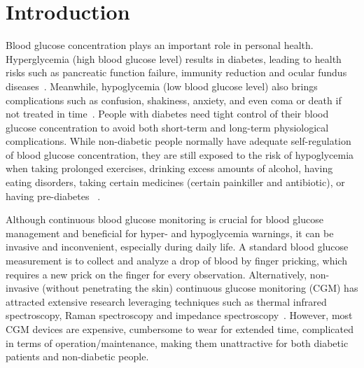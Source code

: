 
\section{Introduction}
\label{sec:intro}
Blood glucose concentration plays an important role in personal health.
Hyperglycemia (high blood glucose level) results in diabetes, leading to health risks such as pancreatic function failure, immunity reduction and ocular fundus diseases~\cite{bib:DC95:Klein}.
Meanwhile, hypoglycemia (low blood glucose level) also brings complications such as confusion, shakiness, anxiety, and even coma or death if not treated in time~\cite{bib:AJM91:DCCT}.
People with diabetes need tight control of their blood glucose concentration to avoid both short-term and long-term physiological complications.
While non-diabetic people normally have adequate self-regulation of blood glucose concentration, they are still exposed to the risk of hypoglycemia when taking prolonged exercises, drinking excess amounts of alcohol, having eating disorders, taking certain medicines (\eg certain painkiller and antibiotic), or having pre-diabetes~\cite{bib:JCEM13:Eckert} \cite{bib:NEJM82:Felig}.

Although continuous blood glucose monitoring is crucial for blood glucose management and beneficial for hyper- and hypoglycemia warnings, it can be invasive and inconvenient, especially during daily life.
A standard blood glucose measurement is to collect and analyze a drop of blood by finger pricking, which requires a new prick on the finger for every observation.
Alternatively, non-invasive (without penetrating the skin) continuous glucose monitoring (CGM) has attracted extensive research leveraging techniques such as thermal infrared spectroscopy, Raman spectroscopy and impedance spectroscopy~\cite{bib:JDST10:Vaddiraju}.
However, most CGM devices are expensive, cumbersome to wear for extended time, complicated in terms of operation/maintenance, making them unattractive for both diabetic patients and non-diabetic people.


